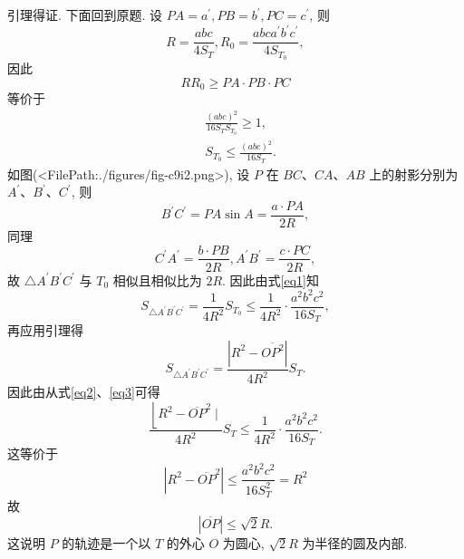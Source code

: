 引理得证.
下面回到原题.
设 $P A=a^{\prime}, P B=b^{\prime}, P C=c^{\prime}$, 则
$$
R=\frac{a b c}{4 S_T}, R_0=\frac{a b c a^{\prime} b^{\prime} c^{\prime}}{4 S_{T_0}},
$$
因此
$$
R R_0 \geqslant P A \cdot P B \cdot P C
$$
等价于
$$
\begin{aligned}
& \frac{(a b c)^2}{16 S_T S_{T_0}} \geqslant 1, \\
& S_{T_0} \leqslant \frac{(a b c)^2}{16 S_T} . 
\end{aligned} \label{eq1}
$$
如图(<FilePath:./figures/fig-c9i2.png>), 设 $P$ 在 $B C 、 C A 、 A B$ 上的射影分别为 $A^{\prime} 、 B^{\prime} 、 C^{\prime}$, 则
$$
B^{\prime} C^{\prime}=P A \sin A=\frac{a \cdot P A}{2 R},
$$
同理
$$
C^{\prime} A^{\prime}=\frac{b \cdot P B}{2 R}, A^{\prime} B^{\prime}=\frac{c \cdot P C}{2 R},
$$
故 $\triangle A^{\prime} B^{\prime} C^{\prime}$ 与 $T_0$ 相似且相似比为 $2 R$. 因此由式\ref{eq1}知
$$
S_{\triangle A^{\prime} B^{\prime} C^{\prime}}=\frac{1}{4 R^2} S_{T_0} \leqslant \frac{1}{4 R^2} \cdot \frac{a^2 b^2 c^2}{16 S_T}, \label{eq2}
$$
再应用引理得
$$
S_{\triangle A^{\prime} B^{\prime} C^{\prime}}=\frac{\left|R^2-\overline{O P^2}\right|}{4 R^2} S_T . \label{eq3}
$$
因此由从式\ref{eq2}、\ref{eq3}可得
$$
\frac{\left\lfloor R^2-\overline{O P}^2 \mid\right.}{4 R^2} S_T \leqslant \frac{1}{4 R^2} \cdot \frac{a^2 b^2 c^2}{16 S_T} .
$$
这等价于
$$
\left|R^2-\overline{O P}^2\right| \leqslant \frac{a^2 b^2 c^2}{16 S_T^2}=R^2
$$
故
$$
|\overline{O P}| \leqslant \sqrt{2} R .
$$
这说明 $P$ 的轨迹是一个以 $T$ 的外心 $O$ 为圆心, $\sqrt{2} R$ 为半径的圆及内部.



